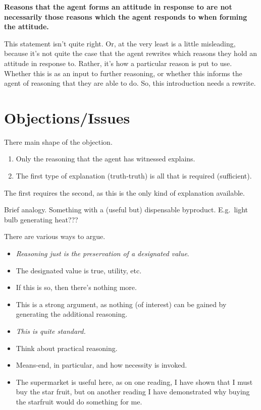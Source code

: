 \documentclass[10pt]{article}
\newcommand{\hozlinedash}[0]{%
  \noindent\hdashrule[0.5ex][c]{\textwidth}{.1pt}{2.5pt}
}
\begin{document}
\hozlinedash

\textbf{Reasons that the agent forms an attitude in response to are not necessarily those reasons which the agent responds to when forming the attitude.}

{
  \color{red}
  This statement isn't quite right.
  Or, at the very least is a little misleading, because it's not quite the case that the agent rewrites which reasons they hold an attitude in response to.
  Rather, it's how a particular reason is put to use.
  Whether this is as an input to further reasoning, or whether this informs the agent of reasoning that they are able to do.
  So, {\color{blue} this introduction needs a rewrite.}
}

\newpage


\section{Objections/Issues}
\label{sec:objectionsissues}


There main shape of the objection.
\begin{enumerate}
\item Only the reasoning that the agent has witnessed explains.
\item The first type of explanation (truth-truth) is all that is required (sufficient).
\end{enumerate}

The first requires the second, as this is the only kind of explanation available.

Brief analogy.
Something with a (useful but) dispensable byproduct.
E.g.\ light bulb generating heat???

There are various ways to argue.


\begin{itemize}
\item \emph{Reasoning just is the preservation of a designated value}.
\item The designated value is true, utility, etc.
\item If this is so, then there's nothing more.
\item This is a strong argument, as nothing (of interest) can be gained by generating the additional reasoning.
\end{itemize}

\begin{itemize}
\item \emph{This is quite standard.}
\item Think about practical reasoning.
\item Means-end, in particular, and how necessity is invoked.
\item The supermarket is useful here, as on one reading, I have shown that I must buy the star fruit, but on another reading I have demonstrated why buying the starfruit would do something for me.
\end{itemize}
\end{document}
